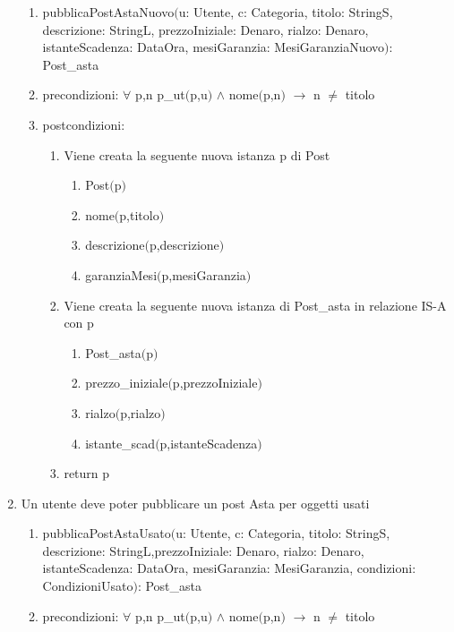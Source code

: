 \documentclass{article}
\begin{document}
\begin{enumerate}
    \begin{enumerate}
        \item pubblicaPostAstaNuovo$($u: Utente, c: Categoria, titolo: StringS, descrizione: StringL, prezzoIniziale: Denaro, rialzo: Denaro, istanteScadenza: DataOra, mesiGaranzia: MesiGaranziaNuovo$)$: Post\_asta
        \item precondizioni: $\forall$ p,n p\_ut$($p,u$)$ $\land$ nome$($p,n$)$ $\rightarrow$ n $\neq$ titolo
        \item postcondizioni:
        \begin{enumerate}
            \item Viene creata la seguente nuova istanza p di Post
            \begin{enumerate}
                \item Post$($p$)$
                \item nome$($p,titolo$)$
                \item descrizione$($p,descrizione$)$
                \item garanziaMesi$($p,mesiGaranzia$)$
            \end{enumerate}
            \item Viene creata la seguente nuova istanza di Post\_asta in relazione IS-A con p
            \begin{enumerate}
                \item Post\_asta$($p$)$
                \item prezzo\_iniziale$($p,prezzoIniziale$)$
                \item rialzo$($p,rialzo$)$
                \item istante\_scad$($p,istanteScadenza$)$
            \end{enumerate}
            \item return p
        \end{enumerate}
    \end{enumerate}
    \newpage
    \item\label{sec:pubblicaPostAstaUsato} Un utente deve poter pubblicare un post Asta per oggetti usati
    \begin{enumerate}
        \item pubblicaPostAstaUsato$($u: Utente, c: Categoria, titolo: StringS, descrizione: StringL,\newline prezzoIniziale: Denaro, rialzo: Denaro, istanteScadenza: DataOra, mesiGaranzia: MesiGaranzia, condizioni: CondizioniUsato$)$: Post\_asta
        \item precondizioni: $\forall$ p,n p\_ut$($p,u$)$ $\land$ nome$($p,n$)$ $\rightarrow$ n $\neq$ titolo

\end{enumerate}
\end{enumerate}
\end{document}
